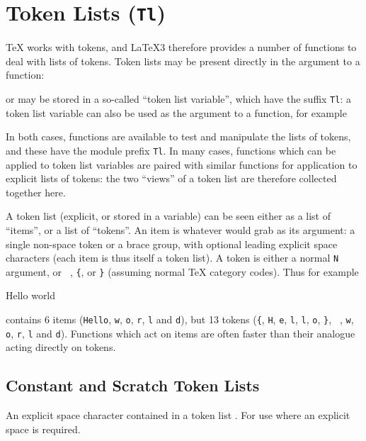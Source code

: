\documentclass[oneside]{book}
\begin{document}
\chapter{Token Lists (\texttt{Tl})}

\TeX{} works with tokens, and \LaTeX3 therefore provides a number of
functions to deal with lists of tokens.  Token lists may be present
directly in the argument to a function:
\begin{codehigh}
\end{codehigh}
or may be stored in a so-called \enquote{token list variable}, which
have the suffix \texttt{Tl}: a token list variable can also be used as
the argument to a function, for example
\begin{codehigh}
\TlVarFoo \lSomeTl
\end{codehigh}
In both cases, functions are available to test and manipulate the lists
of tokens, and these have the module prefix \texttt{Tl}.
In many cases, functions which can be applied to token list variables
are paired with similar functions for application to explicit lists
of tokens: the two \enquote{views} of a token list are therefore collected
together here.

A token list (explicit, or stored in a variable) can be seen either
as a list of \enquote{items},
or a list of \enquote{tokens}. An item is whatever  would
grab as its argument: a single non-space token or a brace group,
with optional leading explicit space characters (each item is thus
itself a token list). A token is either a normal \texttt{N} argument,
or \verb*| |, \verb|{|, or \verb|}| (assuming normal \TeX{} category codes).
Thus for example
\begin{codehigh}
{Hello} world
\end{codehigh}
contains 6 items (\texttt{Hello}, \texttt{w}, \texttt{o}, \texttt{r},
\texttt{l} and \texttt{d}), but 13 tokens (\verb|{|, \texttt{H}, \texttt{e},
\texttt{l}, \texttt{l}, \texttt{o}, \verb|}|, \verb*| |, \texttt{w}, \texttt{o},
\texttt{r}, \texttt{l} and \texttt{d}).
Functions which act on items are often faster than their analogue acting
directly on tokens.

\section{Constant and Scratch Token Lists}

\begin{variable}{\cSpaceTl}
An explicit space character contained in a token list%
. For use where an explicit space is required.
\end{variable}
\end{document}
